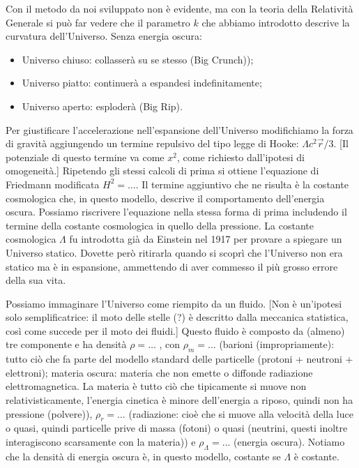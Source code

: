\documentclass[12pt,a4paper,fleqn,draft]{article}
\begin{document}
Con il metodo da noi sviluppato non è evidente, ma con la teoria della
Relatività Generale si può far vedere che il parametro $k$ che abbiamo
introdotto descrive la curvatura dell'Universo. Senza energia oscura:
\begin{itemize}
\item Universo chiuso: collasserà su se stesso (Big Crunch));
\item Universo piatto: continuerà a espandesi indefinitamente;
\item Universo aperto: esploderà (Big Rip).
\end{itemize}

Per giustificare l'accelerazione nell'espansione dell'Universo modifichiamo la
forza di gravità aggiungendo un termine repulsivo del tipo legge di Hooke:
$\Lambda c^2\vec{r}/3$. [Il potenziale di questo termine va come $x^2$, come
richiesto dall'ipotesi di omogeneità.] Ripetendo gli stessi calcoli di prima si
ottiene l'equazione di Friedmann modificata $H^2 = \dots$. Il termine aggiuntivo
che ne risulta è la costante cosmologica che, in questo modello, descrive il
comportamento dell'energia oscura. Possiamo riscrivere l'equazione nella stessa
forma di prima includendo il termine della costante cosmologica in quello della
pressione. La costante cosmologica $\Lambda$ fu introdotta già da Einstein nel
1917 per provare a spiegare un Universo statico. Dovette però ritirarla quando
si scoprì che l'Universo non era statico ma è in espansione, ammettendo di aver
commesso il più grosso errore della sua vita.

Possiamo immaginare l'Universo come riempito da un fluido. [Non è un'ipotesi
solo semplificatrice: il moto delle stelle (?) è descritto dalla meccanica
statistica, così come succede per il moto dei fluidi.] Questo fluido è composto
da (almeno) tre componente e ha densità $\rho = \dots$ , con $\rho_m = \dots$
(barioni (impropriamente): tutto ciò che fa parte del modello standard delle
particelle (protoni + neutroni + elettroni); materia oscura: materia che non
emette o diffonde radiazione elettromagnetica. La materia è tutto ciò che
tipicamente si muove non relativisticamente, l'energia cinetica è minore
dell'energia a riposo, quindi non ha pressione (polvere)), $\rho_r = \dots$
(radiazione: cioè che si muove alla velocità della luce o quasi, quindi
particelle prive di massa (fotoni) o quasi (neutrini, questi inoltre
interagiscono scarsamente con la materia)) e $\rho_\Lambda = \dots$ (energia
oscura). Notiamo che la densità di energia oscura è, in questo modello, costante
se $\Lambda$ è costante.
\end{document}
